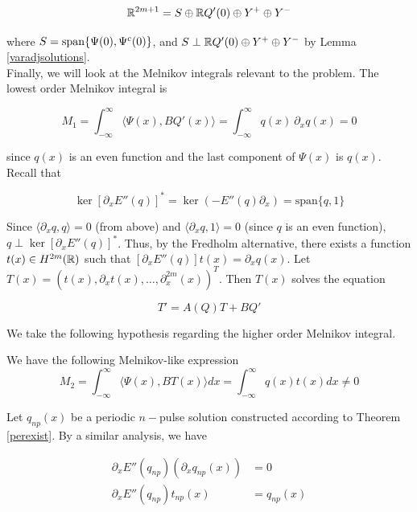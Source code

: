 \documentclass[thesis.tex]{subfiles}
\begin{document}
\begin{equation}
{\mathbb R}^{2m+1} = S \oplus {\mathbb R} Q'(0) \oplus Y^+ \oplus Y^-
\end{equation}

where $S = \operatorname{span}\{ \Psi(0), \Psi^c(0) \}$, and $S \perp {\mathbb R} Q'(0) \oplus Y^+ \oplus Y^-$ by Lemma \ref{varadjsolutions}.\\

Finally, we will look at the Melnikov integrals relevant to the problem. The lowest order Melnikov integral is

\begin{equation}\label{M1}
M_1 = \int_{-\infty}^\infty \langle \Psi(x), B Q'(x) \rangle =
\int_{-\infty}^\infty q(x) \: \partial_x q(x) = 0
\end{equation}

since $q(x)$ is an even function and the last component of $\Psi(x)$ is $q(x)$. Recall that 

\[
\ker [\partial_x E''(q)]^* = \ker(-E''(q) \partial_x) = 
\text{span}\{ q, 1 \}
\]

Since $\langle \partial_x q, q \rangle = 0$ (from above) and $\langle \partial_x q, 1 \rangle = 0$ (since $q$ is an even function), $q \perp \ker [\partial_x E''(q)]^*$. Thus, by the Fredholm alternative, there exists a function $t(x) \in H^{2m}({\mathbb R})$ such that $[ \partial_x E''(q) ]t(x) = \partial_x q(x)$. Let $T(x) = (t(x), \partial_x t(x), \dots, \partial_x^{2m}(x))^T$. Then $T(x)$ solves the equation

\begin{equation}\label{eqforT}
T' = A(Q)T + B Q'
\end{equation}

We take the following hypothesis regarding the higher order Melnikov integral.

\begin{hypothesis}\label{Melnikov2hyp}
We have the following Melnikov-like expression
\begin{equation}\label{M2}
M_2 = \int_{-\infty}^\infty \langle \Psi(x), B T(x) \rangle dx =
\int_{-\infty}^\infty q(x) t(x) dx \neq 0
\end{equation}
\end{hypothesis}

Let $q_{np}(x)$ be a periodic $n-$pulse solution constructed according to Theorem \ref{perexist}. By a similar analysis, we have

\begin{align*}
\partial_x E''(q_{np}) (\partial_x q_{np}(x)) &= 0 \\
\partial_x E''(q_{np}) t_{np}(x) &= q_{np}(x) \\
\end{align*}
\end{document}
